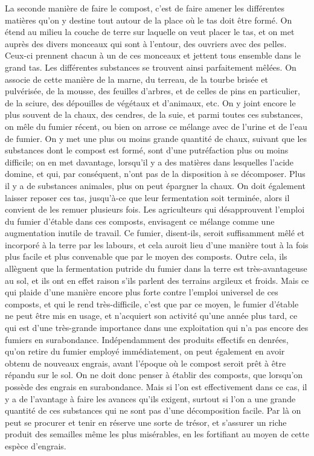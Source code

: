 La seconde manière de faire le compost,\setcounter{page}{56} c'est de faire amener les différentes matières qu'on y destine tout autour de la place où le tas doit être formé. On étend au milieu la couche de terre sur laquelle on veut placer le tas, et on met auprès des divers monceaux qui sont à l'entour, des ouvriers avec des pelles. Ceux-ci prennent chacun à un de ces monceaux et jettent tous ensemble dans le grand tas. Les différentes substances se trouvent ainsi parfaitement mêlées. On associe de cette manière de la marne, du terreau, de la tourbe brisée et pulvérisée, de la mousse, des feuilles d'arbres, et de celles de pins en particulier, de la sciure, des dépouilles de végétaux et d'animaux, etc. On y joint encore le plus souvent de la chaux, des cendres, de la suie, et parmi toutes ces substances, on mêle du fumier récent, ou bien on arrose ce mélange avec de l'urine et de l'eau de fumier. On y met une plus ou moins grande quantité de chaux, suivant que les substances dont le compost est formé, sont d'une putréfaction plus ou moins difficile; on en met davantage, lorsqu'il y a des matières dans lesquelles l'acide domine, et qui, par conséquent, n'ont pas de la disposition à se décomposer. Plus il y a de substances animales, plus on peut\setcounter{page}{57} épargner la chaux. On doit également laisser reposer ces tas, jusqu'à-ce que leur fermentation soit terminée, alors il convient de les remuer plusieurs fois.
Les agriculteurs qui désapprouvent l'emploi du fumier d'étable dans ces composts, envisagent ce mélange comme une augmentation inutile de travail. Ce fumier, disent-ils, seroit suffisamment mêlé et incorporé à la terre par les labours, et cela auroit lieu d'une manière tout à la fois plus facile et plus convenable que par le moyen des composts. Outre cela, ils allèguent que la fermentation putride du fumier dans la terre est très-avantageuse au sol, et ils ont en effet raison s'ils parlent des terrains argileux et froids.
Mais ce qui plaide d'une manière encore plus forte contre l'emploi universel de ces composts, et qui le rend très-difficile, c'est que par ce moyen, le fumier d'étable ne peut être mis en usage, et n'acquiert son activité qu'une année plus tard, ce qui est d'une très-grande importance dans une exploitation qui n'a pas encore des fumiers en surabondance.
Indépendamment des produits effectifs en denrées, qu'on retire du fumier employé\setcounter{page}{58} immédiatement, on peut également en avoir obtenu de nouveaux engrais, avant l'époque où le compost seroit prêt à être répandu sur le sol.
On ne doit donc penser à établir des composts, que lorsqu'on possède des engrais en surabondance. Mais si l'on est effectivement dans ce cas, il y a de l'avantage à faire les avances qu'ils exigent, surtout si l'on a une grande quantité de ces substances qui ne sont pas d'une décomposition facile. Par là on peut se procurer et tenir en réserve une sorte de trésor, et s'assurer un riche produit des semailles même les plus misérables, en les fortifiant au moyen de cette espèce d'engrais.
